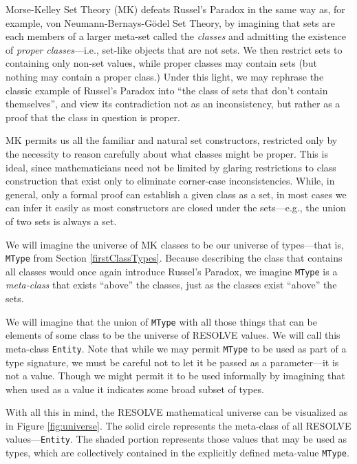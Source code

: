 Morse-Kelley Set Theory (MK) defeats Russel's Paradox in the same way as, for example, von Neumann-Bernays-G\"{o}del Set Theory, by imagining that sets are each members of a larger meta-set called the \emph{classes} and admitting the existence of \emph{proper classes}---i.e., set-like objects that are not sets.  We then restrict sets to containing only non-set values, while proper classes may contain sets (but nothing may contain a proper class.)  Under this light, we may rephrase the classic example of Russel's Paradox into ``the class of sets that don't contain themselves'', and view its contradiction not as an inconsistency, but rather as a proof that the class in question is proper.

MK permits us all the familiar and natural set constructors, restricted only by the necessity to reason carefully about what classes might be proper.  This is ideal, since mathematicians need not be limited by glaring restrictions to class construction that exist only to eliminate corner-case inconsistencies.  While, in general, only a formal proof can establish a given class as a set, in most cases we can infer it easily as most constructors are closed under the sets---e.g., the union of two sets is always a set.

We will imagine the universe of MK classes to be our universe of types---that is, \texttt{MType} from Section \ref{firstClassTypes}.  Because describing the class that contains all classes would once again introduce Russel's Paradox, we imagine \texttt{MType} is a \emph{meta-class} that exists ``above'' the classes, just as the classes exist ``above'' the sets.

We will imagine that the union of \texttt{MType} with all those things that can be elements of some class to be the universe of RESOLVE values.  We will call this meta-class \texttt{Entity}.  Note that while we may permit \texttt{MType} to be used as part of a type signature, we must be careful not to let it be passed as a parameter---it is not a value.  Though we might permit it to be used informally by imagining that when used as a value it indicates some broad subset of types.

With all this in mind, the RESOLVE mathematical universe can be visualized as in Figure \ref{fig:universe}.  The solid circle represents the meta-class of all RESOLVE values---\texttt{Entity}.  The shaded portion represents those values that may be used as types, which are collectively contained in the explicitly defined meta-value \texttt{MType}.

